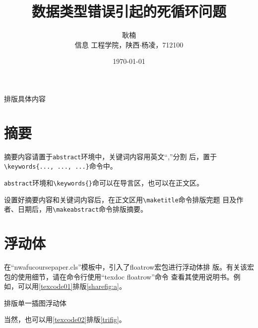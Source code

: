 \documentclass{nwafucoursepaper}
\title{\bfseries\sffamily 数据类型错误引起的死循环问题}
\author{\zihao{4} \fangsong 耿楠\\\small \songti 信息
  工程学院，陕西$\cdot$杨凌，712100}
\date{\small \today}
\begin{document}
\maketitle
\thispagestyle{empty}
\makeabstract

排版具体内容
\section{摘要}
摘要内容请置于\verb|abstract|环境中，关键词内容用英文\enquote{,}分割
后，置于\verb|\keywords{..., ..., ...}|命令中。

\verb|abstract|环境和\verb|\keywords{}|命可以在导言区，也可以在正文区。

设置好摘要内容和关键词内容后，在正文区用\verb|\maketitle|命令排版完题
目及作者、日期后，用\verb|\makeabstract|命令排版摘要。
\section{浮动体}
在\enquote{nwafucoursepaper.cls}模板中，引入了floatrow宏包进行浮动体排
版。有关该宏包的使用细节，请在命令行使用\enquote{texdoc floatrow}命令
查看其使用说明书。例如，可以用\cref{texcode01}排版\autoref{sharefig:a}。

\begin{center}
\begin{minipage}{0.95\linewidth}
\begin{langCVOne}[tex][texcode01][\LaTeX{}]{排版单一插图浮动体}
  \begin{figure}[!htp]
    \begin{floatrow}
    \end{floatrow}
  \end{figure}
\end{langCVOne}
\end{minipage}
\end{center}



当然，也可以用\cref{texcode02}排版\autoref{trifig}。  
\end{document}
